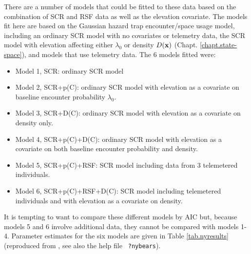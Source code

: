 
There are a number of models that could be fitted to these data based on
the combination of SCR and RSF data as well as the elevation covariate.  
The models fit here are
 based on the Gaussian hazard trap encounter/space usage model,
including an ordinary SCR model with no covariates or telemetry data,
the SCR model with elevation affecting either $\lambda_{0}$ or density
$D({\bf x})$ (Chapt. \ref{chapt.state-space}), and models that use
telemetry data.  The 6 models fitted were:
\begin{itemize}
\item[] Model 1,  SCR: ordinary SCR model
\item[] Model 2, SCR+p(C): ordinary SCR model with elevation as a
  covariate on baseline encounter probability $\lambda_{0}$.
\item[] Model 3, SCR+D(C): ordinary SCR model with elevation as a
  covariate on density only.
\item[] Model 4, SCR+p(C)+D(C): ordinary SCR model with elevation as
  a covariate on both baseline encounter probability and density.
\item[] Model 5, SCR+p(C)+RSF: SCR model including data from 3
  telemetered individuals.
\item[] Model 6, SCR+p(C)+RSF+D(C): SCR model including telemetered
  individuals and with elevation as a covariate on density.
\end{itemize}
It is tempting to want to compare these different models by AIC but,
because models 5 and 6 involve additional data, they cannot be
compared with models 1-4.  Parameter estimates for the six models are
given in Table \ref{tab.nyresults} (reproduced from
\citet{royle_etal:2012mee}, see also the help file \mbox{\tt
  ?nybears}).

